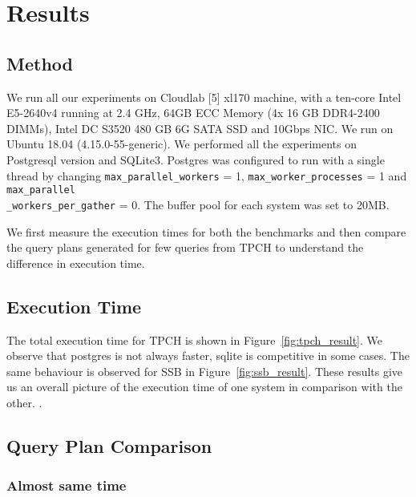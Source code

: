 \section{Results}
\label{sec:bench}

\subsection{Method}
We run all our experiments on Cloudlab [5] xl170 machine, with a ten-core Intel E5-2640v4 running at 2.4 GHz, 64GB ECC Memory (4x 16 GB DDR4-2400 DIMMs), Intel DC S3520 480 GB 6G SATA SSD and 10Gbps NIC. We run on Ubuntu 18.04 (4.15.0-55-generic). We performed all the experiments on Postgresql version and SQLite3. Postgres was configured to run with a  single thread by changing \texttt{max\_parallel\_workers} = 1, \texttt{max\_worker\_processes} = 1 and \texttt{max\_parallel\\\_workers\_per\_gather} = 0. The buffer pool for each system was set to 20MB.

We first measure the execution times for both the benchmarks and then compare the query plans generated for few queries from TPCH to understand the difference in execution time. 


\subsection{Execution Time}
\label{sec:time}



The total execution time for TPCH is shown in Figure~\ref{fig:tpch_result}. We observe that postgres is not always faster, sqlite is competitive in some cases. The same behaviour is observed for SSB in Figure~\ref{fig:ssb_result}. These results give us an overall picture of the execution time of one system in comparison with the other.
. 


\subsection{Query Plan Comparison}
\label{sec:plan}

\subsubsection{Almost same time}

